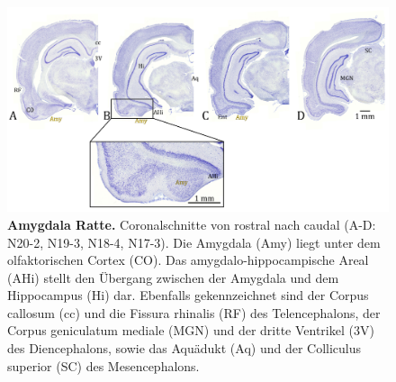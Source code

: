 \begin{figure}[H]
    \centering
    \includegraphics[width=\textwidth]{pictures/Bilder_Jule/Ratte/amygdala.png}
    \caption[Amygdala Ratte]{\textbf{Amygdala Ratte.} Coronalschnitte von rostral nach caudal (A-D: N20-2, N19-3, N18-4, N17-3). Die Amygdala (Amy) liegt unter dem olfaktorischen Cortex (CO). Das amygdalo-hippocampische Areal (AHi) stellt den Übergang zwischen der Amygdala und dem Hippocampus (Hi) dar. Ebenfalls gekennzeichnet sind der Corpus callosum (cc) und die Fissura rhinalis (RF) des Telencephalons, der Corpus geniculatum mediale (MGN) und der dritte Ventrikel (3V) des Diencephalons, sowie das Aquädukt (Aq) und der Colliculus superior (SC) des Mesencephalons.}
    \label{fig:amygdala_ratte}
\end{figure}{}

